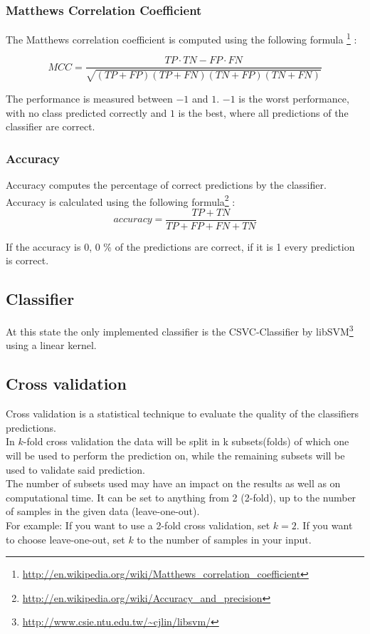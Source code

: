 \documentclass[headsepline,12pt,a4paper]{scrartcl}
\begin{document}
\subsubsection{Matthews Correlation Coefficient}
The Matthews correlation coefficient is computed using the following formula \footnote[2]{\url{http://en.wikipedia.org/wiki/Matthews_correlation_coefficient}} :

  \[MCC = \frac{TP \cdot TN - FP \cdot FN}{\sqrt{(TP + FP) (TP + FN) (TN + FP) (TN + FN)}}\]

The performance is measured between $-1$ and $1$. $-1$ is the worst
performance, with no class predicted correctly and $1$ is the best, where all predictions of the classifier are correct.

\subsubsection{Accuracy}
Accuracy computes the percentage of correct predictions by the classifier. \\
Accuracy is calculated using the following formula\footnote[3]{\url{http://en.wikipedia.org/wiki/Accuracy_and_precision}} : 
\[ accuracy = \frac{TP + TN}{TP + FP + FN + TN} \]

If the accuracy is 0, 0 \% of the predictions are correct, if it is 1 every prediction is correct.

\subsection{Classifier}
At this state the only implemented classifier is the CSVC-Classifier by libSVM\footnote[4]{\url{http://www.csie.ntu.edu.tw/~cjlin/libsvm/}} using a linear kernel.

\subsection{Cross validation}
Cross validation is a statistical technique to evaluate the quality of the classifiers predictions. \\
In $k$-fold cross validation the data will be split in k subsets(folds) of which one will be used to perform the prediction on, while the remaining subsets will be used to validate said prediction.\\ The number of subsets used may have an impact on the results as well as on computational time. It can be set to anything from 2 (2-fold), up to the number of samples in the given data (leave-one-out). \\
For example: If you want to use a 2-fold cross validation, set $k = 2$. If you want to choose leave-one-out, set $k$ to the number of samples in your input.
\end{document}
